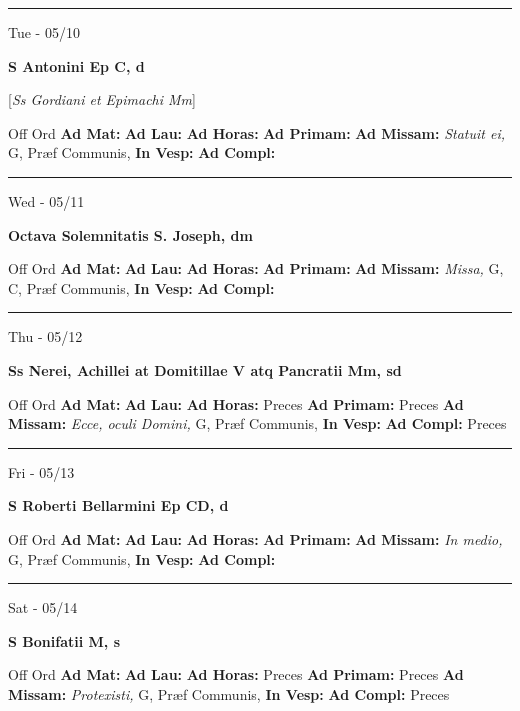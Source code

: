 \documentclass[letterpaper, 10pt]{article}
\begin{document}
\hrule
\begin{center}
Tue - 05/10
\end{center}\textbf{ \large S Antonini Ep C, \textnormal{\normalsize d}}

[\textit{Ss Gordiani et Epimachi Mm}]
\begin{justify}
Off Ord
\textbf{Ad Mat: }
\textbf{Ad Lau: }
\textbf{Ad Horas: }
\textbf{Ad Primam: }
\textbf{Ad Missam:} \textit{Statuit ei, } G, Præf Communis, 
\textbf{In Vesp: }
\textbf{Ad Compl: }\end{justify}



\hrule
\begin{center}
Wed - 05/11
\end{center}\textbf{ \large Octava Solemnitatis S. Joseph, \textnormal{\normalsize dm}}
\begin{justify}
Off Ord
\textbf{Ad Mat: }
\textbf{Ad Lau: }
\textbf{Ad Horas: }
\textbf{Ad Primam: }
\textbf{Ad Missam:} \textit{Missa, } G, C, Præf Communis, 
\textbf{In Vesp: }
\textbf{Ad Compl: }\end{justify}



\hrule
\begin{center}
Thu - 05/12
\end{center}\textbf{ \large Ss Nerei, Achillei at Domitillae V atq Pancratii Mm, \textnormal{\normalsize sd}}
\begin{justify}
Off Ord
\textbf{Ad Mat: }
\textbf{Ad Lau: }
\textbf{Ad Horas: }Preces
\textbf{Ad Primam: }Preces
\textbf{Ad Missam:} \textit{Ecce, oculi Domini, } G, Præf Communis, 
\textbf{In Vesp: }
\textbf{Ad Compl: }Preces\end{justify}



\hrule
\begin{center}
Fri - 05/13
\end{center}\textbf{ \large S Roberti Bellarmini Ep CD, \textnormal{\normalsize d}}
\begin{justify}
Off Ord
\textbf{Ad Mat: }
\textbf{Ad Lau: }
\textbf{Ad Horas: }
\textbf{Ad Primam: }
\textbf{Ad Missam:} \textit{In medio, } G, Præf Communis, 
\textbf{In Vesp: }
\textbf{Ad Compl: }\end{justify}



\hrule
\begin{center}
Sat - 05/14
\end{center}\textbf{ \large S Bonifatii M, \textnormal{\normalsize s}}
\begin{justify}
Off Ord
\textbf{Ad Mat: }
\textbf{Ad Lau: }
\textbf{Ad Horas: }Preces
\textbf{Ad Primam: }Preces
\textbf{Ad Missam:} \textit{Protexisti, } G, Præf Communis, 
\textbf{In Vesp: }
\textbf{Ad Compl: }Preces\end{justify}
\end{document}
